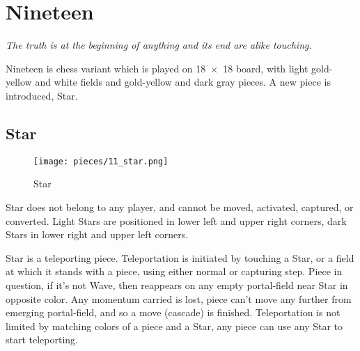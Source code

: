 

\chapter*{Nineteen}
\label{ch:Nineteen}

\begin{flushright}
\parbox{0.8\textwidth}{
\emph{The truth is at the beginning of anything and its end are alike touching.\newline
{} } }
\end{flushright}

\noindent
Nineteen is chess variant which is played on 18~$\times$~18 board, with
light gold-yellow and white fields and gold-yellow and dark gray pieces.
A new piece is introduced, Star.

\clearpage %

\section*{Star}
\label{sec:Nineteen/Star}

\vspace*{-1.0\baselineskip}
\noindent
\begin{wrapfigure}[11]{l}{0.4\textwidth}
\centering
\texttt{[image: pieces/11\_star.png]}
\caption{Star}
\label{fig:11_star}
\end{wrapfigure}
Star does not belong to any player, and cannot be moved, activated, captured, or
converted. Light Stars are positioned in lower left and upper right corners, dark
Stars in lower right and upper left corners.

Star is a teleporting piece. Teleportation is initiated by touching a Star, or a
field at which it stands with a piece, using either normal or capturing step. Piece
in question, if it's not Wave, then reappears on any empty portal-field near Star
in opposite color. Any momentum carried is lost, piece can't move any further from
emerging portal-field, and so a move (cascade) is finished. Teleportation is not
limited by matching colors of a piece and a Star, any piece can use any Star to
start teleporting.

